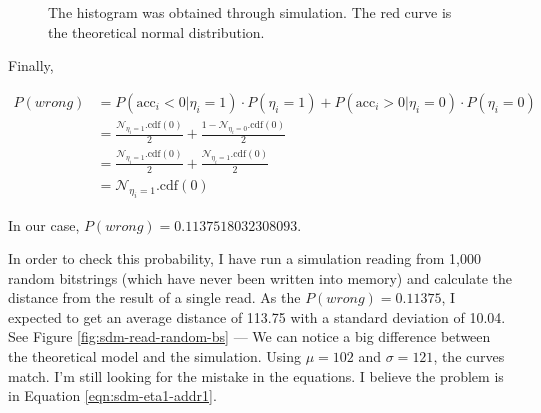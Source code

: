 \documentclass[12pt]{article}
\begin{document}
\begin{figure}[h!]
  \centering

  \caption{The histogram was obtained through simulation. The red curve is the theoretical normal distribution.}
  \label{fig:sdm-read}
\end{figure}


Finally,

\begin{align}
P(wrong) &= P(\text{acc}_i < 0 | \eta_i = 1) \cdot P(\eta_i = 1) + P(\text{acc}_i > 0 | \eta_i = 0) \cdot P(\eta_i = 0) \\
    &= \frac{\mathcal{N}_{\eta_i=1}.\text{cdf}(0)}{2} + \frac{1-\mathcal{N}_{\eta_i=0}.\text{cdf}(0)}{2} \\
    &= \frac{\mathcal{N}_{\eta_i=1}.\text{cdf}(0)}{2} + \frac{\mathcal{N}_{\eta_i=1}.\text{cdf}(0)}{2} \\
    &= \mathcal{N}_{\eta_i=1}.\text{cdf}(0)
\end{align}

In our case, $P(wrong) = 0.1137518032308093$.

In order to check this probability, I have run a simulation reading from 1,000 random bitstrings (which have never been written into memory) and calculate the distance from the result of a single read. As the $P(wrong) = 0.11375$, I expected to get an average distance of 113.75 with a standard deviation of 10.04. See Figure \ref{fig:sdm-read-random-bs} --- We can notice a big difference between the theoretical model and the simulation. Using $\mu=102$ and $\sigma=121$, the curves match. I'm still looking for the mistake in the equations. I believe the problem is in Equation \ref{eqn:sdm-eta1-addr1}.
\end{document}
